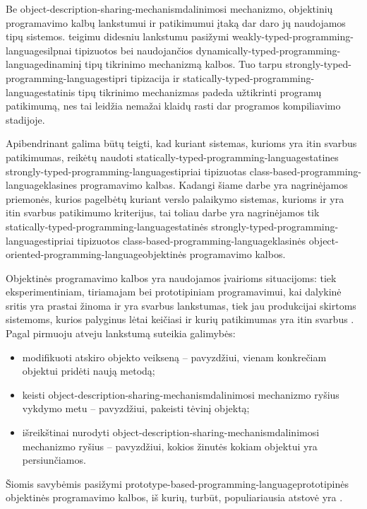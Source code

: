Be \gls{object-description-sharing-mechanism}{dalinimosi mechanizmo},
objektinių programavimo kalbų lankstumui ir patikimumui įtaką
dar daro jų naudojamos tipų sistemos. \cite[2]{Madsen:1990:STO:97946.97964}
teigimu didesniu lankstumu pasižymi
\gls{weakly-typed-programming-language}{silpnai tipizuotos} bei
naudojančios \gls{dynamically-typed-programming-language}{dinaminį
tipų tikrinimo mechanizmą} kalbos. Tuo tarpu
\gls{strongly-typed-programming-language}{stipri tipizacija} ir
\gls{statically-typed-programming-language}{statinis tipų tikrinimo
mechanizmas} padeda užtikrinti programų patikimumą, nes tai
leidžia nemažai klaidų rasti dar programos kompiliavimo stadijoje.

Apibendrinant galima būtų teigti, kad kuriant sistemas, kurioms yra
itin svarbus patikimumas, reikėtų naudoti
\gls{statically-typed-programming-language}{statines}
\gls{strongly-typed-programming-language}{stipriai tipizuotas}
\gls{class-based-programming-language}{klasines} programavimo kalbas.
Kadangi šiame darbe yra nagrinėjamos priemonės, kurios pagelbėtų
kuriant verslo palaikymo sistemas, kurioms ir yra itin svarbus
patikimumo kriterijus, tai toliau darbe yra nagrinėjamos tik
\gls{statically-typed-programming-language}{statinės}
\gls{strongly-typed-programming-language}{stipriai tipizuotos}
\gls{class-based-programming-language}{klasinės}
\gls{object-oriented-programming-language}{objektinės} programavimo
kalbos.

Objektinės programavimo kalbos yra naudojamos įvairioms situacijoms:
tiek eksperimentiniam, tiriamajam bei prototipiniam programavimui, kai
dalykinė sritis yra prastai žinoma ir yra svarbus lankstumas, tiek
jau produkcijai skirtoms sistemoms, kurios palyginus
lėtai keičiasi ir kurių patikimumas yra itin
svarbus \cite{Lieberman:1987:TO:62139.62144}. Pagal \cite{Lieberman:1987:TO:62139.62144} pirmuoju
atveju lankstumą suteikia galimybės:
\begin{itemize}
  \item modifikuoti atskiro objekto veikseną – pavyzdžiui, vienam
    konkrečiam objektui pridėti naują metodą;
  \item keisti \gls{object-description-sharing-mechanism}{dalinimosi
    mechanizmo} ryšius vykdymo metu – pavyzdžiui, pakeisti tėvinį
    objektą;
  \item išreikštinai nurodyti
    \gls{object-description-sharing-mechanism}{dalinimosi mechanizmo}
    ryšius – pavyzdžiui, kokios žinutės kokiam objektui yra
    persiunčiamos.
\end{itemize}
Šiomis savybėmis pasižymi
\gls{prototype-based-programming-language}{prototipinės objektinės
programavimo kalbos}, iš kurių, turbūt, populiariausia atstovė yra
.

